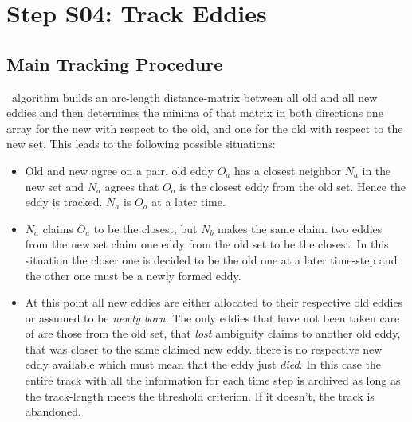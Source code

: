 \section[Tracking]{Step S04: Track Eddies} \label{S:05}
\subsection{Main Tracking Procedure}
~algorithm builds an arc-length distance-matrix
between all old and all new eddies and then determines the minima of that
matrix in both directions \ie one array for the new with respect to the old,
and one for the old with respect to the new set. This leads to the following
possible situations:
\begin{itemize}
\item
	Old and new agree on a pair. \Ie old eddy $O_a$ has a closest neighbor $N_a$ in
the new set and $N_a$ agrees that $O_a$ is the closest eddy from the old
set. Hence the eddy is tracked.  $N_a$ is $O_a$ at a later time.
\item
$N_a$ claims $O_a$ to be the closest, but $N_b$ makes the same claim. \Ie two
eddies from the new set claim one eddy from the old set to be the closest.
In this situation the closer one is decided to be the old one at a later
time-step and the other one must be a newly formed eddy.
\item
At this point all new eddies are either allocated to their respective old
eddies or assumed to be \textit{newly born}. The only eddies that have not been
taken care of are those from the old set, that \textit{lost} ambiguity claims to
another old eddy, that was closer to the same claimed new eddy. \Ie there is no
respective new eddy available which must mean that the eddy just \textit{died}.
In this case the entire track with all the information for each time step is
archived as long as the track-length meets the threshold criterion. If it doesn't,
the track is abandoned.
\end{itemize}
